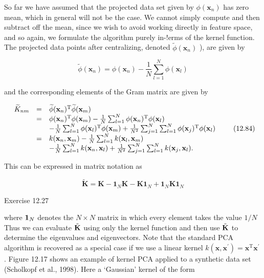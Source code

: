 \documentclass[
  10
]{article}
\begin{document}
So far we have assumed that the projected data set given by
\(\phi (  { \mathbf { x } } _ { n } )\) has zero mean, which in general
will not be the case. We cannot simply compute and then subtract off the
mean, since we wish to avoid working directly in feature space, and so
again, we formulate the algorithm purely in-!erms of the kernel
function. The projected data points after centralizing, denoted
\(\widetilde { \phi } ( \mathbf { x } _ { n } )\) ), are given by

\[
\widetilde {\phi} (\mathbf {x} _ {n}) = \phi (\mathbf {x} _ {n}) - \frac {1}{N} \sum_ {l = 1} ^ {N} \phi (\mathbf {x} _ {l})\tag{12.83}
\]

and the corresponding elements of the Gram matrix are given by

\[
\begin{array}{r c l} \widetilde {K} _ {n m} & = & \widetilde {\phi} (\mathbf {x} _ {n}) ^ {\mathrm{T}} \widetilde {\phi} (\mathbf {x} _ {m}) \\ & = & \phi (\mathbf {x} _ {n}) ^ {\mathrm{T}} \phi (\mathbf {x} _ {m}) - \frac {1}{N} \sum_ {l = 1} ^ {N} \phi (\mathbf {x} _ {n}) ^ {\mathrm{T}} \phi (\mathbf {x} _ {l}) \\ & & - \frac {1}{N} \sum_ {l = 1} ^ {N} \phi (\mathbf {x} _ {l}) ^ {\mathrm{T}} \phi (\mathbf {x} _ {m}) + \frac {1}{N ^ {2}} \sum_ {j = 1} ^ {N} \sum_ {l = 1} ^ {N} \phi (\mathbf {x} _ {j}) ^ {\mathrm{T}} \phi (\mathbf {x} _ {l}) \\ & = & k (\mathbf {x} _ {n}, \mathbf {x} _ {m}) - \frac {1}{N} \sum_ {l = 1} ^ {N} k (\mathbf {x} _ {l}, \mathbf {x} _ {m}) \\ & & - \frac {1}{N} \sum_ {l = 1} ^ {N} k (\mathbf {x} _ {n}, \mathbf {x} _ {l}) + \frac {1}{N ^ {2}} \sum_ {j = 1} ^ {N} \sum_ {l = 1} ^ {N} k (\mathbf {x} _ {j}, \mathbf {x} _ {l}). \end{array}\tag{12.84}
\]

This can be expressed in matrix notation as

\[
\widetilde {\mathbf {K}} = \mathbf {K} - \mathbf {1} _ {N} \mathbf {K} - \mathbf {K} \mathbf {1} _ {N} + \mathbf {1} _ {N} \mathbf {K} \mathbf {1} _ {N}\tag{12.85}
\]

Exercise 12.27

where \({ \bf 1 } _ { N }\) denotes the \(N \times N\) matrix in which
every element takes the value \(1 / N\) Thus we can evaluate
\(\tilde { \bf K }\) using only the kernel function and then use
\(\tilde { \bf K }\) to determine the eigenvalues and eigenvectors. Note
that the standard PCA algorithm is recovered as a special case if we use
a linear kernel
\(k ( \mathbf { x } , \mathbf { x } ^ { \prime } ) = \mathbf { x } ^ { \mathrm { { T } } } \mathbf { x } ^ { \prime }\)
. Figure 12.17 shows an example of kernel PCA applied to a synthetic
data set (Scholkopf et al., 1998). Here a `Gaussian' kernel of the form
\end{document}
